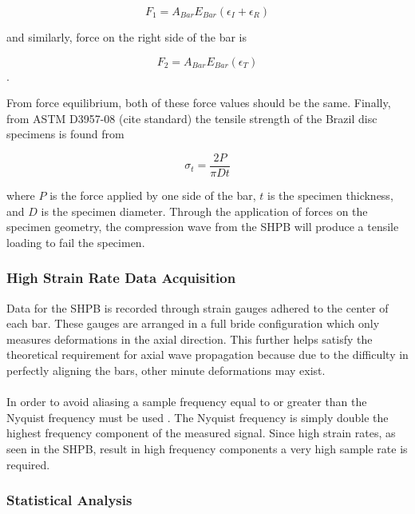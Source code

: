 \documentclass[12pt]{article}
\begin{document}
\begin{equation}
F_1 = A_{Bar}E_{Bar}(\epsilon_I + \epsilon_R)
\end{equation}

and similarly, force on the right side of the bar is

\begin{equation}
F_2 = A_{Bar}E_{Bar}(\epsilon_T)
\end{equation}.

From force equilibrium, both of these force values should be the same. Finally, from ASTM D3957-08 (cite standard) the tensile strength of the Brazil disc specimens is found from

\begin{equation}
\sigma_t = \frac{2P}{\pi Dt}
\end{equation}

where $P$ is the force applied by one side of the bar, $t$ is the specimen thickness, and $D$ is the specimen diameter. Through the application of forces on the specimen geometry, the compression wave from the SHPB will produce a tensile loading to fail the specimen.

\subsubsection{High Strain Rate Data Acquisition} %
Data for the SHPB is recorded through strain gauges adhered to the center of each bar. These gauges are arranged in a full bride configuration which only measures deformations in the axial direction. This further helps satisfy the theoretical requirement for axial wave propagation because due to the difficulty in perfectly aligning the bars, other minute deformations may exist.
\\ \\
In order to avoid aliasing a sample frequency equal to or greater than the Nyquist frequency must be used \cite{Shukla} \cite{Sampling}. The Nyquist frequency is simply double the highest frequency component of the measured signal. Since high strain rates, as seen in the SHPB, result in high frequency components a very high sample rate is required. 

\subsubsection{Statistical Analysis} %
\end{document}
